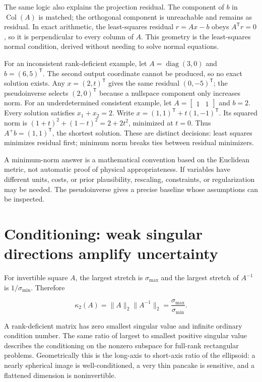 The same logic also explains the projection residual. The component of \(b\) in \(\operatorname{Col}(A)\) is matched; the orthogonal component is unreachable and remains as residual. In exact arithmetic, the least-squares residual \(r=Ax-b\) obeys \(A^\mathsf T r=0\), so it is perpendicular to every column of \(A\). This geometry is the least-squares normal condition, derived without needing to solve normal equations.

For an inconsistent rank-deficient example, let \(A=\operatorname{diag}(3,0)\) and \(b=(6,5)^\mathsf T\). The second output coordinate cannot be produced, so no exact solution exists. Any \(x=(2,t)^\mathsf T\) gives the same residual \((0,-5)^\mathsf T\); the pseudoinverse selects \((2,0)^\mathsf T\) because a nullspace component only increases norm. For an underdetermined consistent example, let \(A=\begin{bmatrix}1&1\end{bmatrix}\) and \(b=2\). Every solution satisfies \(x_1+x_2=2\). Write \(x=(1,1)^\mathsf T+t(1,-1)^\mathsf T\). Its squared norm is \((1+t)^2+(1-t)^2=2+2t^2\), minimized at \(t=0\). Thus \(A^+b=(1,1)^\mathsf T\), the shortest solution. These are distinct decisions: least squares minimizes residual first; minimum norm breaks ties between residual minimizers.

A minimum-norm answer is a mathematical convention based on the Euclidean metric, not automatic proof of physical appropriateness. If variables have different units, costs, or prior plausibility, rescaling, constraints, or regularization may be needed. The pseudoinverse gives a precise baseline whose assumptions can be inspected.

\section{Conditioning: weak singular directions amplify uncertainty}\label{02-foundations-ii-ch024-conditioning-weak-singular-directions-amplify-uncertainty}

For invertible square \(A\), the largest stretch is \(\sigma_{\max}\) and the largest stretch of \(A^{-1}\) is \(1/\sigma_{\min}\). Therefore

\[
\kappa_2(A)=\|A\|_2\|A^{-1}\|_2=\frac{\sigma_{\max}}{\sigma_{\min}}.
\]

A rank-deficient matrix has zero smallest singular value and infinite ordinary condition number. The same ratio of largest to smallest positive singular value describes the conditioning on the nonzero subspace for full-rank rectangular problems. Geometrically this is the long-axis to short-axis ratio of the ellipsoid: a nearly spherical image is well-conditioned, a very thin pancake is sensitive, and a flattened dimension is noninvertible.

